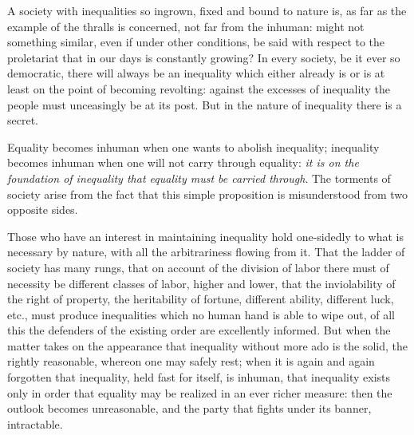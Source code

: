 \documentclass[12pt,a4paper,openany]{book}
\newcommand{\opage}[1]{\marginnote{\footnotesize\textit{[#1]}}}
\begin{document}
A society with inequalities so ingrown, fixed and bound to nature
is, as far as the example of the thralls is concerned,
not far from the inhuman: might not something similar,
even if under other conditions, be
said with respect to the proletariat that in our days is constantly
growing? In every society, be it ever so
democratic, there will always be an inequality which either
already is or is at least on the point of becoming revolting:
against the excesses of inequality the people must unceasingly
be at its post. But in the nature of inequality there is
a secret.

Equality becomes inhuman when one wants to
\setcounter{footnote}{0}%
\opage{146}abolish inequality; inequality becomes inhuman when
one will not carry through equality: \emph{it is on the
foundation of inequality that equality must be carried through}. The torments of society arise from the fact that this simple
proposition is misunderstood from two opposite sides.

Those who have an interest in maintaining inequality
hold one-sidedly to what is necessary by nature, with all the
arbitrariness flowing from it. That the ladder of society has
many rungs, that on account of the division of labor there must
of necessity be different classes of labor, higher and lower,
that the inviolability of the right of property, the heritability
of fortune, different ability, different luck, etc.,
must produce inequalities which no human
hand is able to wipe out, of all this the defenders
of the existing order are excellently informed. But
when the matter takes on the appearance that inequality without
more ado is the solid, the rightly reasonable, whereon one
may safely rest; when it is again and again forgotten
that inequality, held fast for itself, is inhuman,
that inequality exists only in order that equality may be realized
in an ever richer measure: then the outlook becomes
unreasonable, and the party that fights under its banner,
intractable.
\end{document}

